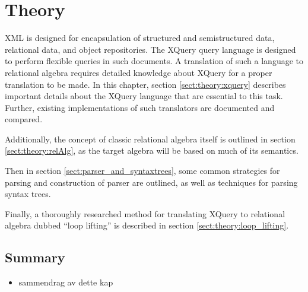 \chapter{Theory}
\label{chapter:theory}
XML is designed for encapsulation of structured and semistructured data,
relational data, and object repositories. The XQuery query language is designed
to perform flexible queries in such documents. A translation of such a
language to relational algebra requires detailed knowledge about XQuery for a
proper translation to be made. In this chapter, section
\ref{sect:theory:xquery} describes important details about the XQuery
language that are essential to this task. Further, existing implementations of
such translators are documented and compared.

Additionally, the concept of classic relational algebra itself is outlined in
section \ref{sect:theory:relAlg}, as the target algebra will be based on much
of its semantics.

Then in section \ref{sect:parser_and_syntaxtrees}, some common strategies for
parsing and construction of parser are outlined, as well as techniques for
parsing syntax trees.

Finally, a thoroughly researched method for translating XQuery to relational
algebra dubbed ``loop lifting'' is described in section
\ref{sect:theory:loop_lifting}.







\section{Summary}
\label{sect:theory:summary}
\begin{itemize}
  \item sammendrag av dette kap
\end{itemize}
